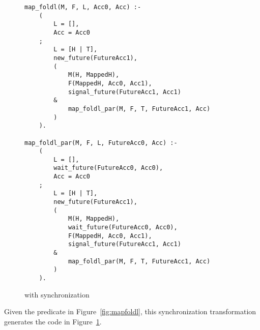 \begin{figure}
\begin{verbatim}
map_foldl(M, F, L, Acc0, Acc) :-
    (
        L = [],
        Acc = Acc0
    ;
        L = [H | T],
        new_future(FutureAcc1),
        (
            M(H, MappedH),
            F(MappedH, Acc0, Acc1),
            signal_future(FutureAcc1, Acc1)
        &
            map_foldl_par(M, F, T, FutureAcc1, Acc)
        )
    ).

map_foldl_par(M, F, L, FutureAcc0, Acc) :-
    (
        L = [],
        wait_future(FutureAcc0, Acc0),
        Acc = Acc0
    ;
        L = [H | T],
        new_future(FutureAcc1),
        (
            M(H, MappedH),
            wait_future(FutureAcc0, Acc0),
            F(MappedH, Acc0, Acc1),
            signal_future(FutureAcc1, Acc1)
        &
            map_foldl_par(M, F, T, FutureAcc1, Acc)
        )
    ).
\end{verbatim}
\caption{\mapfoldl{} with synchronization}
\label{fig:map_foldl_sync}
\end{figure}

Given the \mapfoldl predicate in Figure~\ref{fig:mapfoldl},
this synchronization transformation
generates the code in Figure~\ref{fig:map_foldl_sync}.


